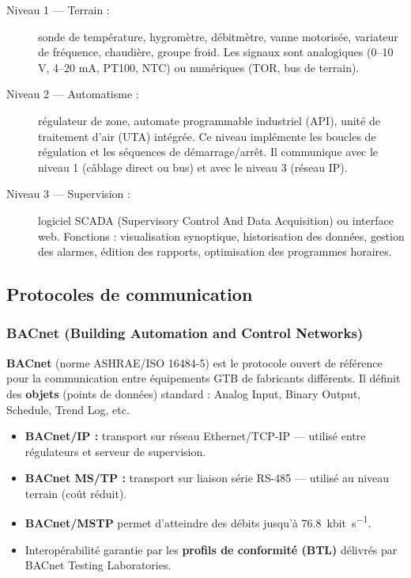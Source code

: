 \begin{description}
  \item[Niveau 1 — Terrain :] sonde de température, hygromètre, débitmètre, vanne motorisée, variateur de fréquence, chaudière, groupe froid. Les signaux sont analogiques (0–10 V, 4–20 mA, PT100, NTC) ou numériques (TOR, bus de terrain).
  \item[Niveau 2 — Automatisme :] régulateur de zone, automate programmable industriel (API), unité de traitement d'air (UTA) intégrée. Ce niveau implémente les boucles de régulation et les séquences de démarrage/arrêt. Il communique avec le niveau 1 (câblage direct ou bus) et avec le niveau 3 (réseau IP).
  \item[Niveau 3 — Supervision :] logiciel SCADA (Supervisory Control And Data Acquisition) ou interface web. Fonctions : visualisation synoptique, historisation des données, gestion des alarmes, édition des rapports, optimisation des programmes horaires.
\end{description}

\subsection{Protocoles de communication}

\subsubsection{BACnet (Building Automation and Control Networks)}

\begin{definition}
  \textbf{BACnet} (norme ASHRAE/ISO 16484-5) est le protocole ouvert de référence pour la communication entre équipements GTB de fabricants différents. Il définit des \textbf{objets} (points de données) standard : Analog Input, Binary Output, Schedule, Trend Log, etc.
\end{definition}

\begin{itemize}
  \item \textbf{BACnet/IP :} transport sur réseau Ethernet/TCP-IP — utilisé entre régulateurs et serveur de supervision.
  \item \textbf{BACnet MS/TP :} transport sur liaison série RS-485 — utilisé au niveau terrain (coût réduit).
  \item \textbf{BACnet/MSTP} permet d'atteindre des débits jusqu'à \SI{76.8}{\kilo bit\per\second}.
  \item Interopérabilité garantie par les \textbf{profils de conformité (BTL)} délivrés par BACnet Testing Laboratories.
\end{itemize}

